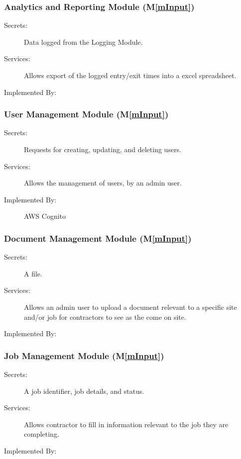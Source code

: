 \documentclass[12pt, titlepage]{article}
\newcommand{\mref}[1]{M\ref{#1}}
\begin{document}
\subsubsection{Analytics and Reporting Module (\mref{mInput})}
\begin{description}
  \item[Secrets:] Data logged from the Logging Module.
  \item[Services:] Allows export of the logged entry/exit times into
    a excel spreadsheet.
  \item[Implemented By:] \progname
\end{description}

\subsubsection{User Management Module (\mref{mInput})}
\begin{description}
  \item[Secrets:] Requests for creating, updating, and deleting users.
  \item[Services:] Allows the management of users, by an admin user.
  \item[Implemented By:] AWS Cognito
\end{description}

\subsubsection{Document Management Module (\mref{mInput})}
\begin{description}
  \item[Secrets:] A file.
  \item[Services:] Allows an admin user to upload a document relevant
    to a specific site and/or job for contractors to see as the come on site.
  \item[Implemented By:] \progname
\end{description}

\subsubsection{Job Management Module (\mref{mInput})}
\begin{description}
  \item[Secrets:] A job identifier, job details, and status.
  \item[Services:] Allows contractor to fill in information relevant
    to the job they are completing.
  \item[Implemented By:] \progname
\end{description}
\end{document}
